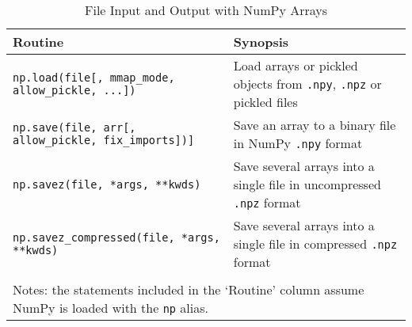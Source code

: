 \documentclass[a4paper,11pt]{book}
\numberwithin{figure}{chapter}
\numberwithin{table}{chapter}
\begin{document}
\begin{sidewaystable}[!htbp]
	\centering 
	\caption{File Input and Output with NumPy Arrays}
	\label{tab:array_io}
	\begin{tabular}{ll}
		\toprule\toprule
		Routine & Synopsis\\
		\midrule
                \texttt{np.load(file[, mmap\_mode, allow\_pickle, ...])} & Load arrays or pickled objects from \texttt{.npy}, \texttt{.npz} or pickled files\\
		\texttt{np.save(file, arr[, allow\_pickle, fix\_imports])]} & Save an array to a binary file in NumPy \texttt{.npy} format\\
		\texttt{np.savez(file, *args, **kwds)} & Save several arrays into a single file in uncompressed \texttt{.npz} format\\
		\texttt{np.savez\_compressed(file, *args, **kwds)} & Save several arrays into a single file in compressed \texttt{.npz} format\\
	     	\bottomrule \\[-1.8ex]
	        \multicolumn{2}{l}{Notes: the statements included in the `Routine' column assume NumPy is loaded with the \texttt{np} alias.} \\
	\end{tabular}
\end{sidewaystable}
\clearpage
\end{document}
